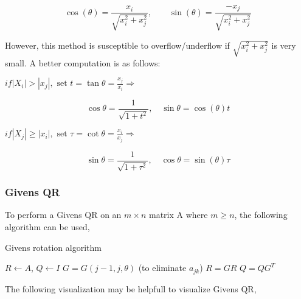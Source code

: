 \documentclass{article}
\begin{document}
$$
    \cos(\theta) = \frac{x_{i}}{\sqrt{x_{i}^{2}+x_{j}^{2}}}, \quad \quad \sin(\theta) = \frac{-x_{j}}{\sqrt{x_{i}^{2}+x_{j}^{2}}}
$$

However, this method is susceptible to overflow/underflow if $\sqrt{x_{i}^{2}+x_{j}^{2}}$ is very small. A better computation is as follows:

$if |X_{i}| > |x_{j}|, \text{ set } t = \tan \theta = \frac{x_{j}}{x_{i}} \Rightarrow$

$$
\cos \theta = \frac{1}{\sqrt{1+t^{2}}}, \quad \sin \theta = \cos (\theta) t
$$

$if |X_{j}| \ge |x_{i}|, \text{ set } \tau = \cot \theta = \frac{x_{i}}{x_{j}} \Rightarrow$

$$
\sin \theta = \frac{1}{\sqrt{1+\tau^{2}}}, \quad \cos \theta = \sin (\theta) \tau
$$


\subsubsection{Givens QR}

To perform a Givens QR on an $m {\times} n$ matrix A where $m \ge n$, the following algorithm can be used,

\begin{minipage}{0.49\textwidth}
\begin{algorithm}[H]
\centering
\caption{Givens rotation algorithm}\label{algorithm}
\begin{algorithmic}[1]
\State $R \gets A$, $Q \gets I$
        \State $G = G(j-1,j,\theta)$ (to eliminate $a_{j k}$)
        \State $R = GR$
        \State $Q = QG^{T}$
    \EndFor
\EndFor
\end{algorithmic}
\end{algorithm}
\end{minipage}\cite{press_numerical_2007}

The following visualization may be helpfull to visualize Givens QR,


$$
\end{document}
